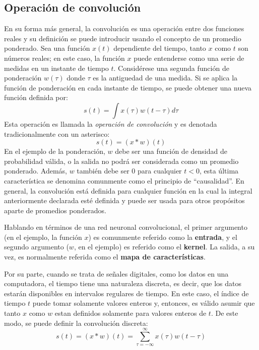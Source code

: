         \subsection{Operación de convolución}
        En su forma más general, la convolución es una operación entre dos funciones reales y su definición se puede introducir
        usando el concepto de un promedio ponderado. Sea una función $x(t)$ dependiente del tiempo, 
        tanto $x$ como $t$ son números reales; en este caso, la función $x$ puede entenderse como una serie de medidas
        en un instante de tiempo $t$. Considérese una segunda función de ponderación $w(\tau)$ donde $\tau$ es la antiguedad 
        de una medida. Si se aplica la función de ponderación en cada instante de tiempo, se puede obtener una nueva función 
        definida por:
        \begin{equation}
            s(t) = \int x(\tau)w(t - \tau) d\tau
        \end{equation} 
        Esta operación es llamada la \textit{operación de convolución} y es denotada tradicionalmente con un asterisco:
        \begin{equation}
            s(t) = (x\ast w)(t)
        \end{equation}
        En el ejemplo de la ponderación, $w$ debe ser una función de densidad de probabilidad válida, o la salida no podrá
        ser considerada como un promedio ponderado. Además, $w$ también debe ser $0$ para cualquier $t<0$, esta última 
        característica se denomina comunmente como el principio de ``causalidad''. En general, la convolución está 
        definida para cualquier función en la cual la integral anteriormente declarada esté definida y puede ser 
        usada para otros propósitos aparte de promedios ponderados.

        Hablando en términos de una red neuronal convolucional, el primer argumento (en el ejemplo, la función $x$) 
        es comunmente referido como la \textbf{entrada}, y el segundo argumento ($w$, en el ejemplo) es referido 
        como el \textbf{kernel}. La salida, a su vez, es normalmente referida como el \textbf{mapa de características}.
        
        Por su parte, cuando se trata de señales digitales, como los datos en una computadora, el tiempo tiene una 
        naturaleza discreta, es decir, que los datos estarán disponibles en intervalos regulares de tiempo. En este 
        caso, el índice de tiempo $t$ puede tomar solamente valores enteros y, entonces, es válido asumir 
        que tanto $x$ como $w$ estan definidos solamente para valores enteros de $t$. De este modo, 
        se puede definir la convolución discreta:
        \begin{equation}
            s(t) = (x \ast w)(t) = \sum_{\tau=-\infty}^{\infty}x(\tau)w(t-\tau)
        \end{equation}

